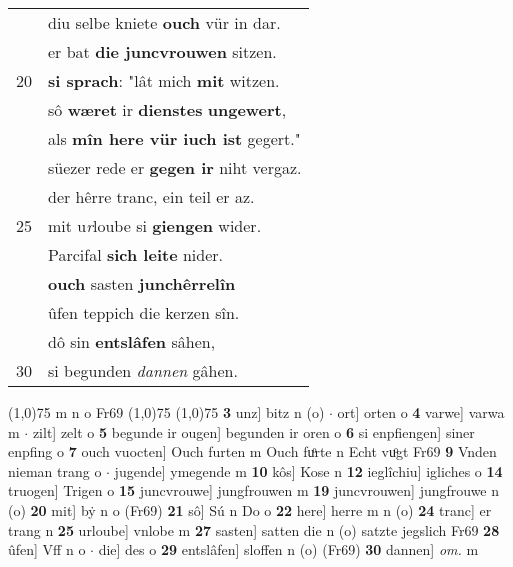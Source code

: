 \documentclass[8pt,a4paper,notitlepage]{article}
\begin{document}
\begin{table}[ht]
\begin{minipage}[t]{0.5\linewidth}
\begin{tabular}{rl}
 & diu selbe kniete \textbf{ouch} vür in dar.\\ 
 & er bat \textbf{die juncvrouwen} sitzen.\\ 
20 & \textbf{si sprach}: "lât mich \textbf{mit} witzen.\\ 
 & sô \textbf{wæret} ir \textbf{dienstes} \textbf{ungewert},\\ 
 & als \textbf{mîn here vür iuch ist} gegert."\\ 
 & süezer rede er \textbf{gegen ir} niht vergaz.\\ 
 & der hêrre tranc, ein teil er az.\\ 
25 & mit u\textit{r}loube si \textbf{giengen} wider.\\ 
 & Parcifal \textbf{sich leite} nider.\\ 
 & \textbf{ouch} sasten \textbf{junchêrrelîn}\\ 
 & ûfen teppich die kerzen sîn.\\ 
 & dô sin \textbf{entslâfen} sâhen,\\ 
30 & si begunden \textit{dannen} gâhen.\\ 
\end{tabular}
\scriptsize
\line(1,0){75} \newline
m n o Fr69 \newline
\line(1,0){75} \newline
\newline
\line(1,0){75} \newline
\textbf{3} unz] bitz n (o)  $\cdot$ ort] orten o \textbf{4} varwe] varwa m  $\cdot$ zilt] zelt o \textbf{5} begunde ir ougen] begunden ir oren o \textbf{6} si enpfiengen] siner enpfing o \textbf{7} ouch vuocten] Ouch furten m Ouch fuͦrte n Echt vuͦgt Fr69 \textbf{9} Vnden nieman trang o  $\cdot$ jugende] ymegende m \textbf{10} kôs] Kose n \textbf{12} ieglîchiu] igliches o \textbf{14} truogen] Trigen o \textbf{15} juncvrouwe] jungfrouwen m \textbf{19} juncvrouwen] jungfrouwe n (o) \textbf{20} mit] bẏ n o (Fr69) \textbf{21} sô] Sú n Do o \textbf{22} here] herre m n (o) \textbf{24} tranc] er trang n \textbf{25} urloube] vnlobe m \textbf{27} sasten] satten die n (o) satzte jegslich Fr69 \textbf{28} ûfen] Vff n o  $\cdot$ die] des o \textbf{29} entslâfen] sloffen n (o) (Fr69) \textbf{30} dannen] \textit{om.} m \newline
\end{minipage}
\end{table}
\newpage
\end{document}
